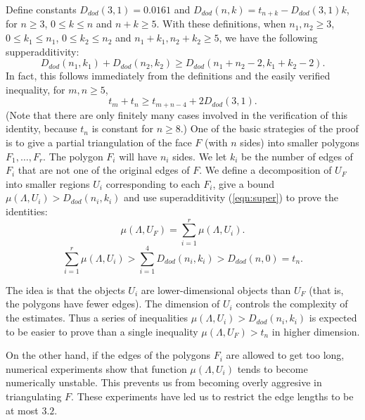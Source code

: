 Define constants $D_{dod}(3,1) = 0.0161$ and $D_{dod}(n,k) = t_{n+k} - D_{dod}(3,1)k$,
for $n\ge 3$, $0\le k\le n$ and $n+k\ge 5$.  With these definitions,
when $n_1,n_2\ge 3$, $0\le k_1\le n_1$, $0\le k_2\le n_2$ and $n_1+k_1,n_2+k_2\ge 5$, we have the following supperadditivity:
\begin{equation}\label{eqn:super}
  D_{dod}(n_1,k_1) + D_{dod}(n_2,k_2) \ge D_{dod}(n_1+n_2-2,k_1+k_2-2).
\end{equation}
In fact, this follows immediately from the definitions and the
easily verified inequality,
for $m,n\ge 5$,
$$
t_m + t_n \ge t_{m+n-4} + 2 D_{dod}(3,1).
$$
(Note that there are only finitely many cases involved in the
verification of this identity,
because $t_n$ is constant for $n\ge 8$.)
One of the basic strategies of the proof is to give a partial triangulation
of the face $F$ (with $n$ sides)
into smaller polygons $F_1,\ldots,F_r$.  The polygon
$F_i$ will have $n_i$ sides.  We let $k_i$ be the number of edges
of $F_i$ that are not one of the original edges of $F$.  We define
a decomposition of $U_F$ into smaller regions $U_i$ corresponding
to each $F_i$, give a bound $\mu(\Lambda,U_i) > D_{dod}(n_i,k_i)$
and use superadditivity (\ref{eqn:super}) to prove the identities:
\begin{equation}\label{eqn:mu}
  \mu(\Lambda,U_F) = \sum_{i=1}^r \mu(\Lambda,U_i).
\end{equation}
\begin{equation}\label{eqn:super-mu}
\sum_{i=1}^r \mu(\Lambda,U_i) > \sum_{i=1}^4 D_{dod}(n_i,k_i)
 > D_{dod}(n,0) = t_n.
\end{equation}

The idea is that the objects $U_i$ are lower-dimensional objects
than $U_F$ (that is, the polygons  have fewer edges).
The dimension of $U_i$ controls the complexity
of the estimates.  Thus a series of inequalities $\mu(\Lambda,U_i) > D_{dod}(n_i,k_i)$
is expected to be easier to prove than a single inequality
$\mu(\Lambda,U_F) > t_n$ in higher dimension.  

On the other hand, if the edges of the polygons $F_i$ are allowed
to get too long, numerical experiments show that function $\mu(\Lambda,U_i)$
tends to become numerically unstable.  This prevents us from
becoming overly aggresive in triangulating $F$.
These experiments have led
us to restrict the edge lengths to be at most $3.2$.

